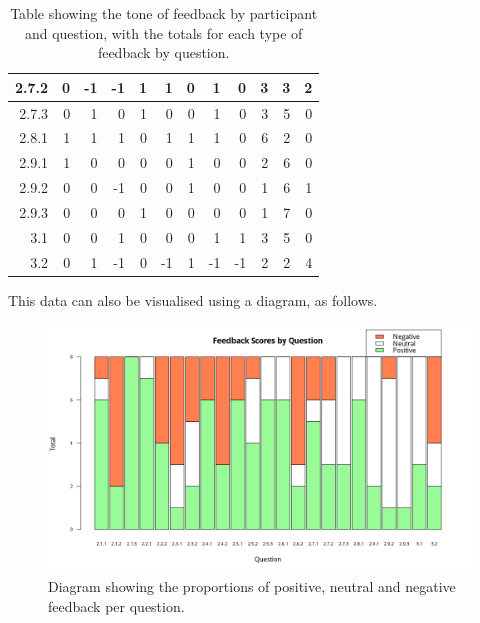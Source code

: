 \documentclass[12pt,twoside,notitlepage,xetex]{report}
\begin{document}
\begin{center}
\begin{table}[H]
\begin{center}
\begin{tabular}{|r||r|r|r|r||r|r|r|r||r|r|r|}
2.7.2 & 0 & -1 & -1 & 1 & 1 & 0 & 1 & 0 & 3 & 3 & 2\\ \hline
2.7.3 & 0 & 1 & 0 & 1 & 0 & 0 & 1 & 0 & 3 & 5 & 0\\ \hline
2.8.1 & 1 & 1 & 1 & 0 & 1 & 1 & 1 & 0 & 6 & 2 & 0\\ \hline
2.9.1 & 1 & 0 & 0 & 0 & 0 & 1 & 0 & 0 & 2 & 6 & 0\\ \hline
2.9.2 & 0 & 0 & -1 & 0 & 0 & 1 & 0 & 0 & 1 & 6 & 1\\ \hline
2.9.3 & 0 & 0 & 0 & 1 & 0 & 0 & 0 & 0 & 1 & 7 & 0\\ \hline
3.1 & 0 & 0 & 1 & 0 & 0 & 0 & 1 & 1 & 3 & 5 & 0\\ \hline
3.2 & 0 & 1 & -1 & 0 & -1 & 1 & -1 & -1 & 2 & 2 & 4\\
\hline
\end{tabular}
\end{center}
\caption{Table showing the tone of feedback by participant and question, with the totals for each type of feedback by question.}
\label{tab:FeedbackScores}
\end{table}
\end{center}

This data can also be visualised using a diagram, as follows.

\begin{center}
\begin{figure}[H]
\begin{center}
\includegraphics[width=\textwidth]{figs/graphs/stacked-scores.png}
\end{center}
\caption{Diagram showing the proportions of positive, neutral and negative feedback per question.}
\label{fig:StackedScores}
\end{figure}
\end{center}
\end{document}
